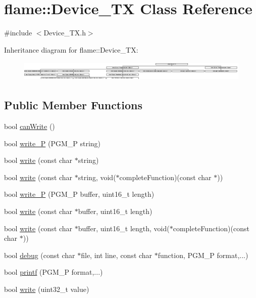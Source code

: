 \hypertarget{classflame_1_1_device___t_x}{\section{flame\-:\-:Device\-\_\-\-T\-X Class Reference}
\label{classflame_1_1_device___t_x}
}


{\ttfamily \#include $<$Device\-\_\-\-T\-X.\-h$>$}

Inheritance diagram for flame\-:\-:Device\-\_\-\-T\-X\-:\begin{figure}[H]
\begin{center}
\leavevmode
\includegraphics[height=0.975610cm]{classflame_1_1_device___t_x}
\end{center}
\end{figure}
\subsection*{Public Member Functions}
\begin{DoxyCompactItemize}
\item 
bool \hyperlink{classflame_1_1_device___t_x_ad9d1d66fe9a4538032e914896f553745}{can\-Write} ()
\item 
bool \hyperlink{classflame_1_1_device___t_x_a1c87e31a7d6b65d7665ff7f266e358df}{write\-\_\-\-P} (P\-G\-M\-\_\-\-P string)
\item 
bool \hyperlink{classflame_1_1_device___t_x_a1dabeeb28eee75aa8d27fa3860244d74}{write} (const char $\ast$string)
\item 
bool \hyperlink{classflame_1_1_device___t_x_a813ba499f49c82722318fa3f8cda2d30}{write} (const char $\ast$string, void($\ast$complete\-Function)(const char $\ast$))
\item 
bool \hyperlink{classflame_1_1_device___t_x_af65ef0e0855089804b34f26a958fdde3}{write\-\_\-\-P} (P\-G\-M\-\_\-\-P buffer, uint16\-\_\-t length)
\item 
bool \hyperlink{classflame_1_1_device___t_x_a42f7f7b191dafbdfeefc03a3d246df1c}{write} (const char $\ast$buffer, uint16\-\_\-t length)
\item 
bool \hyperlink{classflame_1_1_device___t_x_a893f6301eb001fe2bc21e3194ca82c02}{write} (const char $\ast$buffer, uint16\-\_\-t length, void($\ast$complete\-Function)(const char $\ast$))
\item 
bool \hyperlink{classflame_1_1_device___t_x_a185cec8162abc4fafba59e972f59a57e}{debug} (const char $\ast$file, int line, const char $\ast$function, P\-G\-M\-\_\-\-P format,...)
\item 
bool \hyperlink{classflame_1_1_device___t_x_ae31487b1b1e3f8c9749a2bae3f48f1bf}{printf} (P\-G\-M\-\_\-\-P format,...)
\item 
bool \hyperlink{classflame_1_1_device___t_x_a84d278c2d86fb2419338dc2a71dfcaef}{write} (uint32\-\_\-t value)
\end{DoxyCompactItemize}
